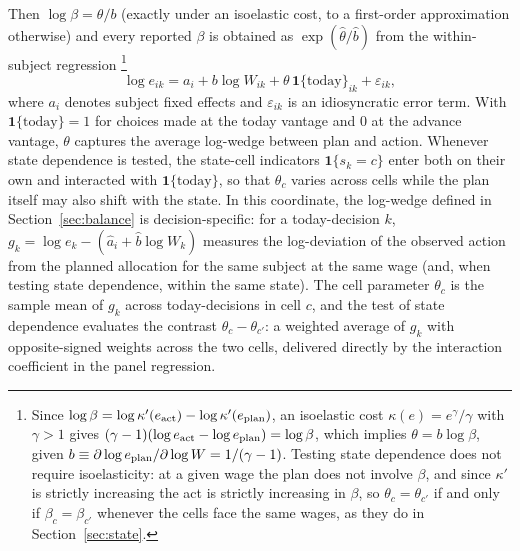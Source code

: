 \documentclass[11pt,a4paper]{article}
\theoremstyle{plain}
\theoremstyle{definition}
\begin{document}
Then $\log\beta = \theta / b$ (exactly under an isoelastic cost, to a first-order approximation otherwise) and every reported $\beta$ is obtained as $\exp(\hat\theta / \hat b)$ from the within-subject regression%
\footnote{Since $\log\beta = \log \kappa'(e_{\rm act}) - \log \kappa'(e_{\rm plan})$, an isoelastic cost $\kappa(e) = e^\gamma/\gamma$ with $\gamma>1$ gives $(\gamma - 1)(\log e_{\rm act} - \log e_{\rm plan}) = \log \beta$, %
which implies $\theta = b \log \beta$, given $b \equiv \partial \log e_{\rm plan} / \partial \log W = 1/(\gamma - 1)$. Testing state dependence does not require isoelasticity: at a given wage the plan does not involve $\beta$, and since $\kappa'$ is strictly increasing the act is strictly increasing in $\beta$, so $\theta_c=\theta_{c'}$ if and only if $\beta_c=\beta_{c'}$ whenever the cells face the same wages, as they do in Section~\ref{sec:state}.}
\[
\log e_{ik} = a_i + b \log W_{ik} + \theta \, \mathbf{1}\{\text{today}\}_{ik} + \varepsilon_{ik} ,
\]
where $a_i$ denotes subject fixed effects %
and $\varepsilon_{ik}$ is an idiosyncratic error term. 
With $\mathbf{1}\{\text{today}\} = 1$ for choices made at the today vantage and $0$ at the advance vantage, $\theta$ captures the average log-wedge between plan and action. Whenever state dependence is tested, the state-cell indicators $\mathbf 1\{s_k=c\}$ enter both on their own and interacted with $\mathbf 1\{\text{today}\}$, so that $\theta_c$ varies across cells while the plan itself may also shift with the state.
In this coordinate, the log-wedge defined in Section~\ref{sec:balance} is decision-specific: for a today-decision $k$, $g_k = \log e_k - (\hat{a}_i + \hat{b}\log W_k)$ measures the log-deviation of the observed action from the planned allocation for the same subject at the same wage (and, when testing state dependence, within the same state). The cell parameter $\theta_c$ is the sample mean of $g_k$ across today-decisions in cell $c$, and the test of state dependence evaluates the contrast $\theta_c - \theta_{c'}$: a weighted average of $g_k$ with opposite-signed weights across the two cells, delivered directly by the interaction coefficient in the panel regression.%
\end{document}
